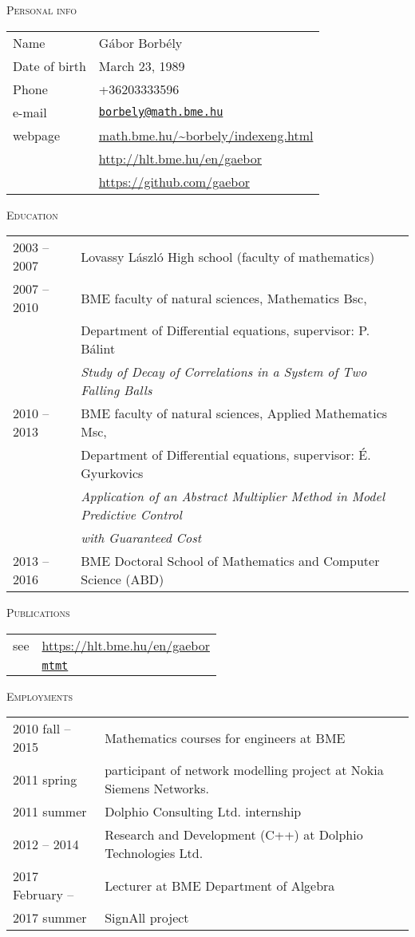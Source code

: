 \documentclass[12pt]{article}
\newcommand\mail[1]{\href{mailto:#1}{\texttt{#1}}}
\begin{document}
 \thispagestyle{empty}
 
\textsc{Personal info}

       \begin{tabular}{p{3cm}l}
	       Name & Gábor Borbély\\
           Date of birth & March 23, 1989\\
		   Phone &  +36203333596\\
		   e-mail & \mail{borbely@math.bme.hu}\\
		   webpage& \url{math.bme.hu/~borbely/indexeng.html} \\
                  & \url{http://hlt.bme.hu/en/gaebor} \\
                  & \url{https://github.com/gaebor}
       \end{tabular}

 \textsc{Education}

       \begin{tabular}{p{3cm}l}
	       2003 -- 2007 & Lovassy László High school (faculty of mathematics) \\
           2007 -- 2010& BME faculty of natural sciences, Mathematics Bsc, \\
		              & Department of Differential equations, supervisor: P. Bálint\\
					  & \emph{Study of Decay of Correlations in a System of Two Falling Balls} \\
		   2010 -- 2013 & BME faculty of natural sciences, Applied Mathematics Msc,\\
						& Department of Differential equations, supervisor: É. Gyurkovics\\
						& \emph{Application of an Abstract Multiplier Method in Model Predictive Control}\\ & \emph{ with Guaranteed Cost} \\
		    2013 -- 2016 & BME Doctoral School of Mathematics and Computer Science (ABD)
       \end{tabular}

 \textsc{Publications}

        \begin{tabular}{p{3cm}l}
	       see & \url{https://hlt.bme.hu/en/gaebor} \\ 
               &  \href{https://m2.mtmt.hu/gui2/?type=authors&mode=browse&sel=10043154}{\texttt{mtmt}}
       \end{tabular}

 \textsc{Employments}

       \begin{tabular}{p{4cm}l}
	       2010 fall -- 2015 & Mathematics courses for engineers at BME\\
           2011 spring  & participant of network modelling project at Nokia Siemens Networks. \\
		   2011 summer    & Dolphio Consulting Ltd. internship\\
		   2012 -- 2014 & Research and Development (C++) at Dolphio Technologies Ltd. \\
           2017 February -- & Lecturer at BME Department of Algebra \\
           2017 summer & SignAll project
       \end{tabular}
\end{document}
